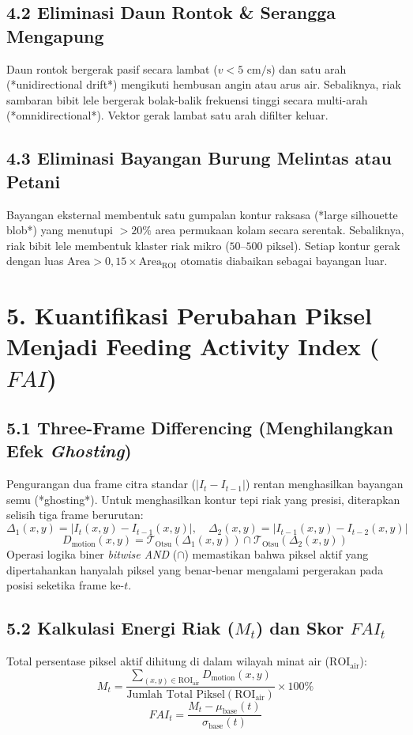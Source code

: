 \documentclass[10pt,a4paper]{article}
\providecommand{\text}[1]{\mbox{#1}}
\begin{document}
\subsection*{4.2 Eliminasi Daun Rontok \& Serangga Mengapung}
Daun rontok bergerak pasif secara lambat ($v < 5\text{ cm/s}$) dan satu arah (*unidirectional drift*) mengikuti hembusan angin atau arus air. Sebaliknya, riak sambaran bibit lele bergerak bolak-balik frekuensi tinggi secara multi-arah (*omnidirectional*). Vektor gerak lambat satu arah difilter keluar.

\subsection*{4.3 Eliminasi Bayangan Burung Melintas atau Petani}
Bayangan eksternal membentuk satu gumpalan kontur raksasa (*large silhouette blob*) yang menutupi $> 20\%$ area permukaan kolam secara serentak. Sebaliknya, riak bibit lele membentuk klaster riak mikro ($50\text{--}500\text{ piksel}$). Setiap kontur gerak dengan luas $\text{Area} > 0,15 \times \text{Area}_{\text{ROI}}$ otomatis diabaikan sebagai bayangan luar.

\section*{5. Kuantifikasi Perubahan Piksel Menjadi Feeding Activity Index ($FAI$)}

\subsection*{5.1 Three-Frame Differencing (Menghilangkan Efek \textit{Ghosting})}
Pengurangan dua frame citra standar ($|I_t - I_{t-1}|$) rentan menghasilkan bayangan semu (*ghosting*). Untuk menghasilkan kontur tepi riak yang presisi, diterapkan selisih tiga frame berurutan:
\begin{equation}
\Delta_1(x,y) = |I_t(x,y) - I_{t-1}(x,y)|, \quad \Delta_2(x,y) = |I_{t-1}(x,y) - I_{t-2}(x,y)|
\end{equation}
\begin{equation}
D_{\text{motion}}(x,y) = \mathcal{T}_{\text{Otsu}}(\Delta_1(x,y)) \cap \mathcal{T}_{\text{Otsu}}(\Delta_2(x,y))
\end{equation}
Operasi logika biner \textit{bitwise AND} ($\cap$) memastikan bahwa piksel aktif yang dipertahankan hanyalah piksel yang benar-benar mengalami pergerakan pada posisi seketika frame ke-$t$.

\subsection*{5.2 Kalkulasi Energi Riak ($M_t$) dan Skor $FAI_t$}
Total persentase piksel aktif dihitung di dalam wilayah minat air ($\text{ROI}_{\text{air}}$):
\begin{equation}
M_t = \frac{\sum_{(x,y) \in \text{ROI}_{\text{air}}} D_{\text{motion}}(x,y)}{\text{Jumlah Total Piksel}(\text{ROI}_{\text{air}})} \times 100\%
\end{equation}
\begin{equation}
FAI_t = \frac{M_t - \mu_{\text{base}}(t)}{\sigma_{\text{base}}(t)}
\end{equation}
\end{document}
